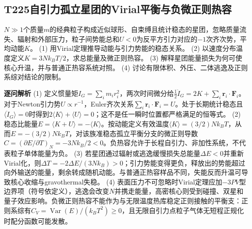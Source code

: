 \subsection*{T225\quad 自引力孤立星团的Virial平衡与负微正则热容}
$N\gg1$个质量$m$的经典粒子构成近似球形、自束缚且统计稳态的星团，忽略质量流失、辐射和外部压力，粒子间势能总和$U<0$为反平方引力对应的$-1$次齐次势，平均动能$K$。
(1) 用Virial定理推导动能与引力势能的稳态关系。
(2) 以速度分布温度定义$K=3Nk_BT/2$，求总能量及微正则热容。
(3) 解释星团能量损失为何可使核心升温，并与普通正热容系统对照。
(4) 讨论有限体积、外压、二体逃逸及正则系综对结论的限制。
\par\textbf{逐问解析}
(1) 定义惯量矩$I_G=\sum_im_ir_i^2$，两次时间微分给$\frac12\ddot I_G=2K+\sum_i\boldsymbol r_i\cdot\boldsymbol F_i$。对于Newton引力势$U\propto r^{-1}$，Euler齐次关系$\sum_i\boldsymbol r_i\cdot\boldsymbol F_i=U$。处于长期统计稳态且$\langle\ddot I_G\rangle=0$时得到$2\langle K\rangle+\langle U\rangle=0$；这不是任一瞬时位置都严格满足的恒等式。
(2) 稳态比能量$E=\langle K+U\rangle=-\langle K\rangle$。按动能定义有效温度$\langle K\rangle=(3/2)Nk_BT$，从而$E=-(3/2)Nk_BT$，对该族准稳态孤立平衡分支的微正则导数$C=(\partial E/\partial T)_N=-3Nk_B/2<0$。负热容允许于长程自引力、非加性系统，不代表粒子单体能量为负。
(3) 若星团通过辐射或逃逸缓慢损失总能量$\Delta E<0$并重新Virial化，则$\Delta T=-2\Delta E/(3Nk_B)>0$；引力势能变得更负，释放出的势能超过向外输送的能量，剩余转成随机动能。与普通正热容样品不同，失能反而升温可导致核心收缩与gravothermal失稳。
(4) 表面压力不可忽略时Virial定理应加$-3PV$型边界项（符号依定义），逃逸会改变$N$并携走能量，高密核心则受到碰撞、双星和量子效应影响。负微正则热容不能作为与无限温度热库稳定正则接触的平衡支：正则系综有$C_V=\operatorname{Var}(E)/(k_BT^2)\ge0$，且无限自引力点粒子气体无短程正规化时配分函数可能发散。
\par\medskip
